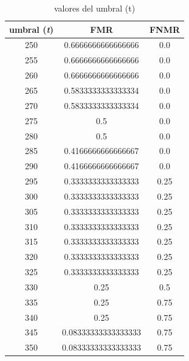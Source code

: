 \documentclass[10pt,a4paper]{article}
\begin{document}
\begin{table}[h!]
\begin{center}
\begin{tabular}{|c|c|c|}
\hline
\textbf{umbral (\textit{t})} & \textbf{FMR} & \textbf{FNMR}  \\ \hline
250 & 0.6666666666666666 & 0.0 \\ \hline
255 & 0.6666666666666666 & 0.0 \\ \hline
260 & 0.6666666666666666 & 0.0 \\ \hline
265 & 0.5833333333333334 & 0.0 \\ \hline
270 & 0.5833333333333334 & 0.0 \\ \hline
275 & 0.5 & 0.0 \\ \hline
280 & 0.5 & 0.0 \\ \hline
285 & 0.4166666666666667 & 0.0 \\ \hline
290 & 0.4166666666666667 & 0.0 \\ \hline
295 & 0.3333333333333333 & 0.25 \\ \hline
300 & 0.3333333333333333 & 0.25 \\ \hline
305 & 0.3333333333333333 & 0.25 \\ \hline
310 & 0.3333333333333333 & 0.25 \\ \hline
315 & 0.3333333333333333 & 0.25 \\ \hline
320 & 0.3333333333333333 & 0.25 \\ \hline
325 & 0.3333333333333333 & 0.25 \\ \hline
330 & 0.25 & 0.5 \\ \hline
335 & 0.25 & 0.75 \\ \hline
340 & 0.25 & 0.75 \\ \hline
345 & 0.08333333333333333 & 0.75 \\ \hline
350 & 0.08333333333333333 & 0.75 \\ \hline
\end{tabular}
\end{center}
  \caption{valores del umbral (t)}
  \label{tabla:errors1}

\end{table}

\pagebreak
\end{document}
